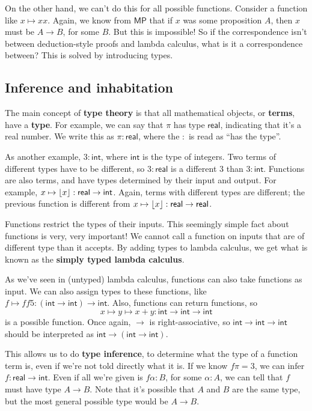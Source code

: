 \documentclass[11pt,paper=letter]{scrartcl}
\newcommand{\sf}{\mathsf}
\begin{document}
On the other hand, we can't do this for all possible functions. Consider a function like $x \mapsto xx$. Again, we know from $\sf{MP}$ that if $x$ was some proposition $A$, then $x$ must be $A \to B$, for some $B$. But this is impossible! So if the correspondence isn't between deduction-style proofs and lambda calculus, what is it a correspondence between? This is solved by introducing types.

\subsection{Inference and inhabitation}

The main concept of \textbf{type theory} is that all mathematical objects, or \textbf{terms}, have a \textbf{type}. For example, we can say that $\pi$ has type $\sf{real}$, indicating that it's a real number. We write this as $\pi : \sf{real}$, where the $:$ is read as ``has the type''.

As another example, $3 : \sf{int}$, where $\sf{int}$ is the type of integers. Two terms of different types have to be different, so $3 : \sf{real}$ is a different $3$ than $3 : \sf{int}$. Functions are also terms, and have types determined by their input and output. For example, $x \mapsto \floor{x} : \sf{real} \to \sf{int}$. Again, terms with different types are different; the previous function is different from $x \mapsto \floor{x} : \sf{real} \to \sf{real}$.

Functions restrict the types of their inputs. This seemingly simple fact about functions is very, very important! We cannot call a function on inputs that are of different type than it accepts. By adding types to lambda calculus, we get what is known as the \textbf{simply typed lambda calculus}.

As we've seen in (untyped) lambda calculus, functions can also take functions as input. We can also assign types to these functions, like $f \mapsto ff5 : (\sf{int} \to \sf{int}) \to \sf{int}$. Also, functions can return functions, so \[
x \mapsto y \mapsto x + y : \sf{int} \to \sf{int} \to \sf{int}
\] is a possible function. Once again, $\to$ is right-associative, so $\sf{int} \to \sf{int} \to \sf{int}$ should be interpreted as $\sf{int} \to (\sf{int} \to \sf{int})$.

This allows us to do \textbf{type inference}, to determine what the type of a function term is, even if we're not told directly what it is. If we know $f\pi = 3$, we can infer $f : \sf{real} \to \sf{int}$. Even if all we're given is $f\alpha : B$, for some $\alpha : A$, we can tell that $f$ must have type $A \to B$. Note that it's possible that $A$ and $B$ are the same type, but the most general possible type would be $A \to B$.
\end{document}
